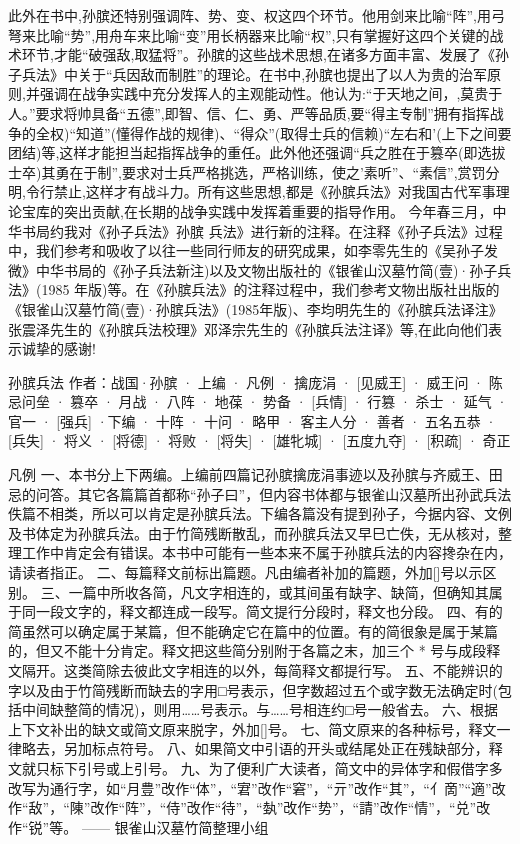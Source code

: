 \documentclass[12pt,UTF8]{ctexbook}
\begin{document}
此外在书中,孙膑还特别强调阵、势、变、权这四个环节。他用剑来比喻“阵”,用弓弩来比喻“势”,用舟车来比喻“变”用长柄器来比喻“权”,只有掌握好这四个关键的战术环节,才能“破强敌,取猛将”。孙膑的这些战术思想,在诸多方面丰富、发展了《孙子兵法》中关于“兵因敌而制胜”的理论。在书中,孙膑也提出了以人为贵的治军原则,并强调在战争实践中充分发挥人的主观能动性。他认为:“于天地之间，,莫贵于人。”要求将帅具备“五德”,即智、信、仁、勇、严等品质,要“得主专制”拥有指挥战争的全权)“知道”(懂得作战的规律)、“得众”(取得士兵的信赖)“左右和’(上下之间要团结)等,这样才能担当起指挥战争的重任。此外他还强调“兵之胜在于篡卒(即选拔士卒)其勇在于制”,要求对士兵严格挑选，严格训练，使之'素听”、“素信”,赏罚分明,令行禁止,这样才有战斗力。所有这些思想,都是《孙膑兵法》对我国古代军事理论宝库的突出贡献,在长期的战争实践中发挥着重要的指导作用。
今年春三月，中华书局约我对《孙子兵法》孙膑
兵法》进行新的注释。在注释《孙子兵法》过程中，我们参考和吸收了以往一些同行师友的研究成果，如李零先生的《吴孙子发微》中华书局的《孙子兵法新注)以及文物出版社的《银雀山汉墓竹简(壹)·孙子兵法》(1985 年版)等。在《孙膑兵法》的注释过程中，我们参考文物出版社出版的《银雀山汉墓竹简(壹)·孙膑兵法》(1985年版)、李均明先生的《孙膑兵法译注》张震泽先生的《孙膑兵法校理》邓泽宗先生的《孙膑兵法注译》等,在此向他们表示诚挚的感谢!

    \mainmatter

孙膑兵法
作者：战国·孙膑
· 上编
· 凡例
· 擒庞涓
· [见威王]
· 威王问
· 陈忌问垒
· 篡卒
· 月战
· 八阵
· 地葆
· 势备
· [兵情]
· 行篡
· 杀士
· 延气
· 官一
· [强兵]
·下编
· 十阵
· 十问
· 略甲
· 客主人分
· 善者
· 五名五恭
· [兵失]
· 将义
· [将德]
· 将败
· [将失]
· [雄牝城]
· [五度九夺]
· [积疏]
· 奇正

凡例
一、本书分上下两编。上编前四篇记孙膑擒庞涓事迹以及孙膑与齐威王、田忌的问答。其它各篇篇首都称“孙子曰”，但内容书体都与银雀山汉墓所出孙武兵法佚篇不相类，所以可以肯定是孙膑兵法。下编各篇没有提到孙子，今据内容、文例及书体定为孙膑兵法。由于竹简残断散乱，而孙膑兵法又早巳亡佚，无从核对，整理工作中肯定会有错误。本书中可能有一些本来不属于孙膑兵法的内容搀杂在内，请读者指正。
二、每篇释文前标出篇题。凡由编者补加的篇题，外加[]号以示区别。
三、一篇中所收各简，凡文字相连的，或其间虽有缺字、缺简，但确知其属于同一段文字的，释文都连成一段写。简文提行分段时，释文也分段。
四、有的简虽然可以确定属于某篇，但不能确定它在篇中的位置。有的简很象是属于某篇的，但又不能十分肯定。释文把这些简分别附于各篇之末，加三个 * 号与成段释文隔开。这类简除去彼此文字相连的以外，每简释文都提行写。
五、不能辨识的字以及由于竹简残断而缺去的字用□号表示，但字数超过五个或字数无法确定时(包括中间缺整简的情况)，则用……号表示。与……号相连约□号一般省去。
六、根据上下文补出的缺文或简文原来脱字，外加[]号。
七、简文原来的各种标号，释文一律略去，另加标点符号。
八、如果简文中引语的开头或结尾处正在残缺部分，释文就只标下引号或上引号。
九、为了便利广大读者，简文中的异体字和假借字多改写为通行字，如“{月豊}”改作“体”，“宭”改作“窘”，“亓”改作“其”，“{亻啇}”“適”改作“敌”，“陳”改作“阵”，“侍”改作“待”，“埶”改作“势”，“請”改作“情”，“兑”改作“锐”等。
—— 银雀山汉墓竹简整理小组
\end{document}
